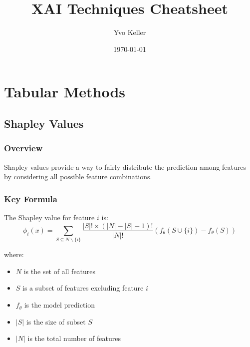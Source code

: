 \documentclass{article}
\title{XAI Techniques Cheatsheet}
\author{Yvo Keller}
\date{\today}
\begin{document}
\maketitle

\section{Tabular Methods}

\subsection{Shapley Values}

\subsubsection{Overview}
Shapley values provide a way to fairly distribute the prediction among features by considering all possible feature combinations.

\subsubsection{Key Formula}
The Shapley value for feature $i$ is:
\begin{equation}
    \phi_i(x) = \sum_{S \subseteq N \backslash\{i\}} \frac{|S|!\times(|N|-|S|-1)!}{|N|!}\left(f_\theta(S \cup\{i\})-f_\theta(S)\right)
\end{equation}

where:
\begin{itemize}
    \item $N$ is the set of all features
    \item $S$ is a subset of features excluding feature $i$
    \item $f_\theta$ is the model prediction
    \item $|S|$ is the size of subset $S$
    \item $|N|$ is the total number of features
\end{itemize}
\end{document}

